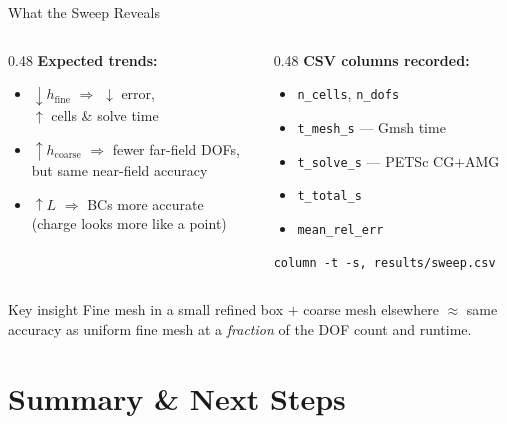 \documentclass[aspectratio=169]{beamer}
\begin{document}
\begin{frame}{What the Sweep Reveals}
  \begin{columns}
    \begin{column}{0.48\textwidth}
      \textbf{Expected trends:}
      \begin{itemize}
        \item $\downarrow h_\text{fine}$ $\Rightarrow$ $\downarrow$ error,\\
              $\uparrow$ cells \& solve time
        \item $\uparrow h_\text{coarse}$ $\Rightarrow$ fewer far-field DOFs,\\
              but same near-field accuracy
        \item $\uparrow L$ $\Rightarrow$ BCs more accurate\\
              (charge looks more like a point)
      \end{itemize}
    \end{column}
    \begin{column}{0.48\textwidth}
      \textbf{CSV columns recorded:}
      \begin{itemize}
        \item \texttt{n\_cells}, \texttt{n\_dofs}
        \item \texttt{t\_mesh\_s} — Gmsh time
        \item \texttt{t\_solve\_s} — PETSc CG+AMG
        \item \texttt{t\_total\_s}
        \item \texttt{mean\_rel\_err}
      \end{itemize}
      \vspace{0.5em}
      \texttt{column -t -s, results/sweep.csv}
    \end{column}
  \end{columns}

  \vspace{0.6em}
  \begin{block}{Key insight}
    Fine mesh in a small refined box $+$ coarse mesh elsewhere
    $\approx$ same accuracy as uniform fine mesh
    at a \emph{fraction} of the DOF count and runtime.
  \end{block}
\end{frame}

\section{Summary \& Next Steps}
\end{document}
